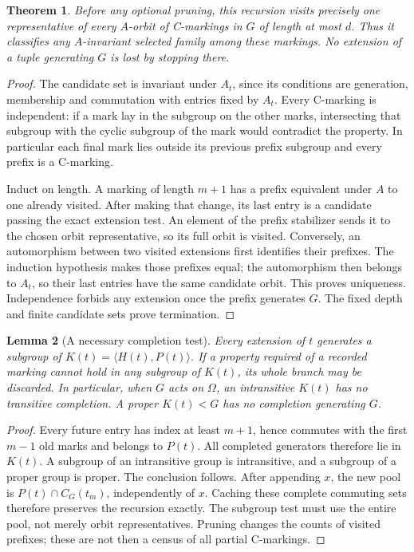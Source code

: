 \documentclass[11pt,a4paper]{article}
\newtheorem{lemma}{Lemma}\newtheorem{theorem}[lemma]{Theorem}
\newcommand{\gen}[1]{\langle#1\rangle}
\begin{document}
\begin{theorem}\label{coverage}
Before any optional pruning, this recursion visits precisely one
representative of every $A$-orbit of C-markings in $G$ of length
at most $d$. Thus it classifies any $A$-invariant selected family
among these markings. No extension of a tuple generating $G$ is
lost by stopping there.
\end{theorem}
\begin{proof}
The candidate set is invariant under $A_t$, since its conditions
are generation, membership and commutation with entries fixed
by $A_t$. Every C-marking is independent: if a mark lay in the
subgroup on the other marks, intersecting that subgroup with
the cyclic subgroup of the mark would contradict the property.
In particular each final mark lies outside its previous prefix
subgroup and every prefix is a C-marking.

Induct on length. A marking of length $m+1$ has a prefix equivalent
under $A$ to one already visited. After making that change, its
last entry is a candidate passing the exact extension test. An
element of the prefix stabilizer sends it to the chosen orbit
representative, so its full orbit is visited. Conversely, an
automorphism between two visited extensions first identifies
their prefixes. The induction hypothesis makes those prefixes
equal; the automorphism then belongs to $A_t$, so their last
entries have the same candidate orbit. This proves uniqueness.
Independence forbids any extension once the prefix generates $G$.
The fixed depth and finite candidate sets prove termination.
\end{proof}

\begin{lemma}[A necessary completion test]\label{completion}
Every extension of $t$ generates a subgroup of
$K(t)=\gen{H(t),P(t)}$. If a property required of a recorded
marking cannot hold in any subgroup of $K(t)$, its whole branch
may be discarded. In particular, when $G$ acts on $\Omega$,
an intransitive $K(t)$ has no transitive completion. A proper
$K(t)<G$ has no completion generating $G$.
\end{lemma}
\begin{proof}
Every future entry has index at least $m+1$, hence commutes with
the first $m-1$ old marks and belongs to $P(t)$. All completed
generators therefore lie in $K(t)$. A subgroup of an intransitive
group is intransitive, and a subgroup of a proper group is proper.
The conclusion follows. After appending $x$, the new pool is
$P(t)\cap C_G(t_m)$, independently of $x$. Caching these complete
commuting sets therefore preserves the recursion exactly.
The subgroup test must use the entire pool, not merely orbit
representatives. Pruning changes the counts of visited prefixes;
these are not then a census of all partial C-markings.
\end{proof}
\end{document}
